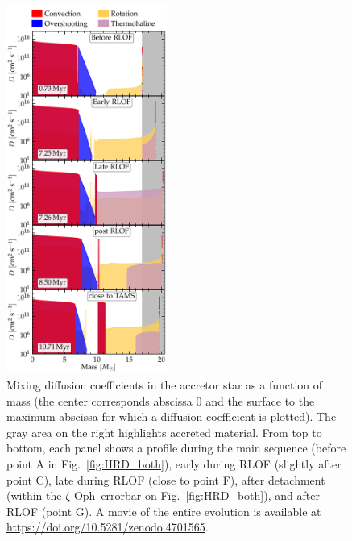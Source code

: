 \documentclass[twocolumn,twocolappendix,trackchanges]{aastex63}
\DeclareRobustCommand{\Figref}[1]{Fig.~\ref{#1}}
\newcommand{\zoph}{$\zeta$ Oph}
\begin{document}
\begin{figure}[htbp]
  \includegraphics[width=0.47\textwidth]{D_mix_vertical}
  \caption{Mixing diffusion coefficients in the accretor star as a
    function of mass (the center corresponds abscissa 0 and the
    surface to the maximum abscissa for which a diffusion coefficient
    is plotted). The gray area on the right highlights accreted
    material. From top to bottom, each panel shows a profile during
    the main sequence (before point A in \Figref{fig:HRD_both}), early
    during RLOF (slightly after point C), late during RLOF (close to
    point F), after detachment (within the \zoph\ errorbar on
    \Figref{fig:HRD_both}), and after RLOF (point G). A movie of the
    entire evolution is available at
    \url{https://doi.org/10.5281/zenodo.4701565}.}
  \label{fig:D_mix}
\end{figure}
\end{document}
